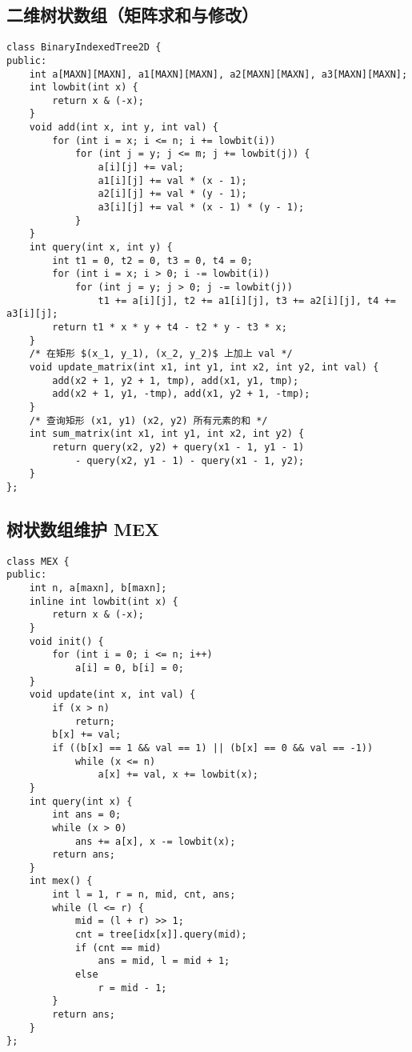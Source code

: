 \subsection{二维树状数组（矩阵求和与修改）}
\begin{verbatim}
class BinaryIndexedTree2D {
public:
    int a[MAXN][MAXN], a1[MAXN][MAXN], a2[MAXN][MAXN], a3[MAXN][MAXN];
    int lowbit(int x) {
        return x & (-x);
    }
    void add(int x, int y, int val) {
        for (int i = x; i <= n; i += lowbit(i))
            for (int j = y; j <= m; j += lowbit(j)) {
                a[i][j] += val;
                a1[i][j] += val * (x - 1);
                a2[i][j] += val * (y - 1);
                a3[i][j] += val * (x - 1) * (y - 1);
            }
    }
    int query(int x, int y) {
        int t1 = 0, t2 = 0, t3 = 0, t4 = 0;
        for (int i = x; i > 0; i -= lowbit(i))
            for (int j = y; j > 0; j -= lowbit(j))
                t1 += a[i][j], t2 += a1[i][j], t3 += a2[i][j], t4 += a3[i][j];
        return t1 * x * y + t4 - t2 * y - t3 * x;
    }
    /* 在矩形 $(x_1, y_1), (x_2, y_2)$ 上加上 val */
    void update_matrix(int x1, int y1, int x2, int y2, int val) {
        add(x2 + 1, y2 + 1, tmp), add(x1, y1, tmp);
        add(x2 + 1, y1, -tmp), add(x1, y2 + 1, -tmp);
    }
    /* 查询矩形 (x1, y1) (x2, y2) 所有元素的和 */
    int sum_matrix(int x1, int y1, int x2, int y2) {
        return query(x2, y2) + query(x1 - 1, y1 - 1)
            - query(x2, y1 - 1) - query(x1 - 1, y2);
    }
};
\end{verbatim}

\subsection{树状数组维护 MEX}
\begin{verbatim}
class MEX {
public:
    int n, a[maxn], b[maxn];	
    inline int lowbit(int x) {
        return x & (-x);
    }
    void init() {
        for (int i = 0; i <= n; i++)
            a[i] = 0, b[i] = 0;
    }
    void update(int x, int val) {
        if (x > n)
            return;
        b[x] += val;
        if ((b[x] == 1 && val == 1) || (b[x] == 0 && val == -1))
            while (x <= n)
                a[x] += val, x += lowbit(x);
    }
    int query(int x) {
        int ans = 0;
        while (x > 0)
            ans += a[x], x -= lowbit(x);
        return ans;
    }
    int mex() {
        int l = 1, r = n, mid, cnt, ans;
        while (l <= r) {
            mid = (l + r) >> 1;
            cnt = tree[idx[x]].query(mid);
            if (cnt == mid)
                ans = mid, l = mid + 1;
            else
                r = mid - 1;
        }
        return ans;
    }
};
\end{verbatim}
\clearpage
